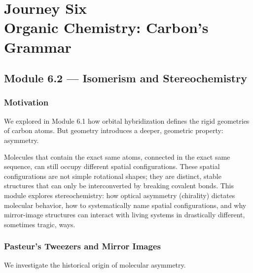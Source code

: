 \documentclass[12pt, a4paper]{book}
\begin{document}
\setcounter{chapter}{5}
\chapter[Journey 6 --- Organic Chemistry: Carbon's Grammar]
        {Journey Six\\[8pt]
         \textcolor{ModuleColor}{\large Organic Chemistry: Carbon's Grammar}}
\setcounter{section}{1}

\section{Module 6.2 --- Isomerism and Stereochemistry}
\label{sec:mod6.2}

\subsection*{Motivation}

We explored in Module 6.1 how orbital hybridization defines the rigid geometries of carbon atoms.
But geometry introduces a deeper, geometric property: asymmetry.

Molecules that contain the exact same atoms, connected in the exact same sequence, can still occupy different spatial configurations.
These spatial configurations are not simple rotational shapes; they are distinct, stable structures that can only be interconverted by breaking covalent bonds.
This module explores stereochemistry: how optical asymmetry (chirality) dictates molecular behavior, how to systematically name spatial configurations, and why mirror-image structures can interact with living systems in drastically different, sometimes tragic, ways.

\subsection{Pasteur's Tweezers and Mirror Images}

We investigate the historical origin of molecular asymmetry.
\end{document}
